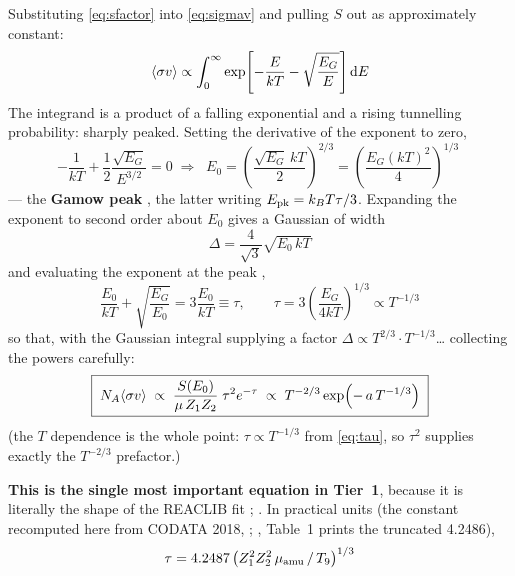 Substituting \eqref{eq:sfactor} into \eqref{eq:sigmav} and pulling $S$ out as
approximately constant:
%
\begin{equation*}
\langle\sigma v\rangle \propto \int_0^\infty
\exp\!\left[-\frac{E}{kT} - \sqrt{\frac{E_G}{E}}\right] \mathrm{d} E
\end{equation*}
%
The integrand is a product of a falling exponential and a rising tunnelling
probability: sharply peaked. Setting the derivative of the exponent to zero,
%
\begin{equation}
-\frac{1}{kT} + \frac{1}{2}\frac{\sqrt{E_G}}{E^{3/2}} = 0
\;\Longrightarrow\;
\boxed{\;E_0 = \left(\frac{\sqrt{E_G}\,kT}{2}\right)^{2/3}
        = \left(\frac{E_G (kT)^2}{4}\right)^{1/3}\;}
\label{eq:gamowpeak}
\end{equation}
%
--- the \textbf{Gamow peak} \citep{adelberger2011,chugunov2007}, the latter
writing $E_{\rm pk} = k_BT\tau/3$. Expanding the exponent to second order about
$E_0$ gives a Gaussian of width \citep[$\Delta E_0/kT = 4\sqrt{E_0/3kT}$]{adelberger2011}
%
\begin{equation}
\Delta = \frac{4}{\sqrt{3}}\sqrt{E_0\,kT}
\label{eq:gamowwidth}
\end{equation}
%
and evaluating the exponent at the peak \citep[their equation for
$\tau$]{chugunov2007},
%
\begin{equation}
\frac{E_0}{kT} + \sqrt{\frac{E_G}{E_0}} = 3\frac{E_0}{kT} \equiv \tau,
\qquad
\tau = 3\left(\frac{E_G}{4kT}\right)^{1/3} \propto T^{-1/3}
\label{eq:tau}
\end{equation}
%
so that, with the Gaussian integral supplying a factor
$\Delta \propto T^{2/3}\cdot T^{-1/3}$\ldots{} collecting the powers carefully:
%
\begin{equation}
\boxed{\;
N_{A}\langle\sigma v\rangle \;\propto\;
\frac{S(E_0)}{\mu\,Z_1Z_2}\;\tau^2 e^{-\tau}
\;\propto\; T^{-2/3}\exp\!\left(-\,a\,T^{-1/3}\right)
\;}
\label{eq:nonresonant}
\end{equation}
%
(the $T$ dependence is the whole point: $\tau \propto T^{-1/3}$ from
\eqref{eq:tau}, so $\tau^2$ supplies exactly the $T^{-2/3}$ prefactor.)

\textbf{This is the single most important equation in Tier~1}, because it is
literally the shape of the REACLIB fit \citep[the expression for
\sigv]{adelberger2011}; \citep[Table~1]{cyburt2010}. In practical units (the
constant recomputed here from CODATA 2018, \citealp{codata};
\citealp{cyburt2010}, Table~1 prints the truncated 4.2486),
%
\begin{equation}
\tau = 4.2487\,\bigl(Z_1^2 Z_2^2\,\mu_{\rm amu}\,/\,T_{9}\bigr)^{1/3}
\label{eq:taupractical}
\end{equation}


